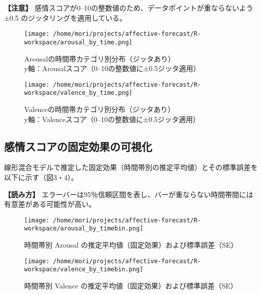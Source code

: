 \documentclass[a4paper,11pt]{article}
\begin{document}
\vspace{1ex}
\noindent \textbf{【注意】} 感情スコアが0–10の整数値のため、データポイントが重ならないよう±0.5 のジッタリングを適用している。

\begin{figure}[H]
  \centering
  \begin{minipage}{0.4\columnwidth}
     \centering
     \texttt{[image: /home/mori/projects/affective-forecast/R-workspace/arousal\_by\_time.png]}
     \caption{Arousalの時間帯カテゴリ別分布（ジッタあり）\\y軸：Arousalスコア（0–10の整数値に±0.5ジッタ適用）}
  \end{minipage}
%
  \begin{minipage}{0.4\columnwidth}
     \centering
     \texttt{[image: /home/mori/projects/affective-forecast/R-workspace/valence\_by\_time.png]}
     \caption{Valenceの時間帯カテゴリ別分布（ジッタあり）\\y軸：Valenceスコア（0–10の整数値に±0.5ジッタ適用）}
  \end{minipage}
\end{figure}

\subsection*{感情スコアの固定効果の可視化}
線形混合モデルで推定した固定効果（時間帯別の推定平均値）とその標準誤差を以下に示す（図3・4）。

\vspace{1ex}
\noindent \textbf{【読み方】} エラーバーは95％信頼区間を表し、バーが重ならない時間帯間には有意差がある可能性が高い。

\begin{figure}[H]
  \centering
  \begin{minipage}{0.4\columnwidth}
     \centering
     \texttt{[image: /home/mori/projects/affective-forecast/R-workspace/arousal\_by\_timebin.png]}
     \caption{時間帯別 Arousal の推定平均値（固定効果）および標準誤差（SE）}
  \end{minipage}
%
  \begin{minipage}{0.4\columnwidth}
     \centering
     \texttt{[image: /home/mori/projects/affective-forecast/R-workspace/valence\_by\_timebin.png]}
     \caption{時間帯別 Valence の推定平均値（固定効果）および標準誤差（SE）}
  \end{minipage}
\end{figure}
\end{document}
